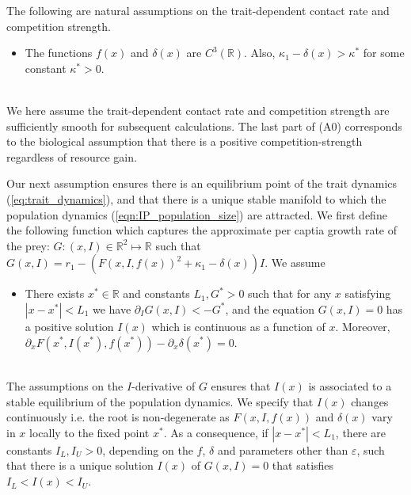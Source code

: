 \documentclass[]{article}
\theoremstyle{remark}
\begin{document}
The following are natural assumptions on the trait-dependent contact rate and competition strength.
\ \\
\begin{itemize}
    \item[(A0)] The functions $f(x)$ and $\delta(x)$ are $C^3(\mathbb{R})$. Also, $\kappa_1-\delta(x)>\kappa^{*}$ for some constant $\kappa^{*}>0$.
    \end{itemize}
\ \\
We here assume the trait-dependent contact rate and competition strength are sufficiently smooth for subsequent calculations. The last part of (A0) corresponds to the biological assumption that there is a positive competition-strength regardless of resource gain. 

Our next assumption ensures there is an equilibrium point of the trait dynamics (\ref{eq:trait_dynamics}), and that there is a unique stable manifold to which the population dynamics (\ref{eqn:IP_population_size}) are attracted. We first define the  following function which captures the approximate per captia growth rate of the prey: $G: (x,I)\in\mathbb{R} ^2\mapsto\mathbb{R}$ such that $G(x,I)=r_1-(F(x,I,f(x))^2+\kappa_1-\delta(x))I$. We assume
\ \\
\begin{itemize}
    \item[(A1)] There exists $x^{*}\in\mathbb{R}$ and constants $L_1,G^{*}>0$ such that for any $x$ satisfying $|x-x^{*}|<L_1$ we have $\partial_{I}G(x,I)<-G^{*}$, and the equation
$G(x,I)=0$ has a positive solution $I(x)$ which is continuous as a function of $x$. Moreover, $\partial_{x}F(x^{*},I(x^{*}),f(x^{*}))-\partial_{x}\delta(x^{*})=0$.
    \end{itemize}
\ \\
The assumptions on the $I$-derivative of $G$ ensures that $I(x)$ is associated to a stable equilibrium of the population dynamics. We specify that $I(x)$ changes continuously i.e. the root is non-degenerate as $F(x,I,f(x))$ and $\delta(x)$ vary in $x$ locally to the fixed point $x^{*}$. As a consequence, if $|x-x^{*}|<L_1$, there are constants $I_L,I_U>0$, depending on the $f$, $\delta$ and parameters other than $\varepsilon$, such that there is a unique solution $I(x)$ of $G(x,I)=0$ that satisfies $I_L<I(x)<I_U$.
\end{document}
